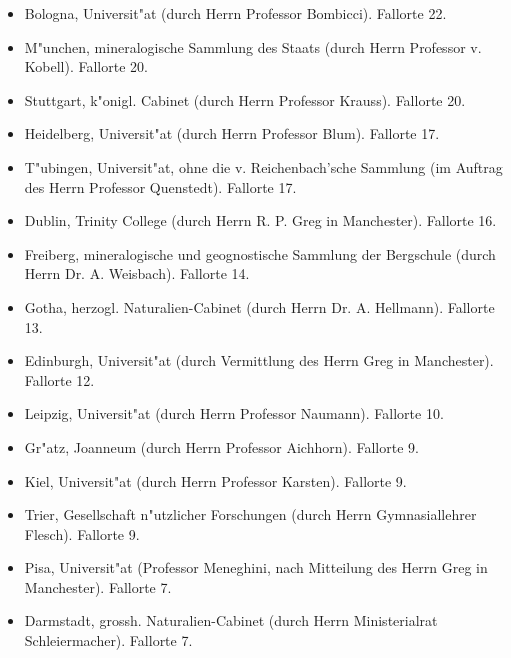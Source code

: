 \documentclass[a4paper, 11pt, oneside]{article}
\begin{document}
\begin{itemize}
    \item Bologna, Universit"at (durch Herrn Professor Bombicci). Fallorte 22.

    \item M"unchen, mineralogische Sammlung des Staats (durch Herrn Professor v. Kobell). Fallorte 20.

    \item Stuttgart, k"onigl. Cabinet (durch Herrn Professor Krauss). Fallorte 20.

    \item Heidelberg, Universit"at (durch Herrn Professor Blum). Fallorte 17.

    \item T"ubingen, Universit"at, ohne die v. Reichenbach'sche Sammlung (im Auftrag des Herrn Professor Quenstedt). Fallorte 17.

    \item Dublin, Trinity College (durch Herrn R. P. Greg in Manchester). Fallorte 16.

    \item Freiberg, mineralogische und geognostische Sammlung der Bergschule (durch Herrn Dr. A. Weisbach). Fallorte 14.

    \item Gotha, herzogl. Naturalien-Cabinet (durch Herrn Dr. A. Hellmann). Fallorte 13.

    \item Edinburgh, Universit"at (durch Vermittlung des Herrn Greg in Manchester). Fallorte 12.

    \item Leipzig, Universit"at (durch Herrn Professor Naumann). Fallorte 10.

    \item Gr"atz, Joanneum (durch Herrn Professor Aichhorn). Fallorte 9.

    \item Kiel, Universit"at (durch Herrn Professor Karsten). Fallorte 9.

    \item Trier, Gesellschaft n"utzlicher Forschungen (durch Herrn Gymnasiallehrer Flesch). Fallorte 9.

    \item Pisa, Universit"at (Professor Meneghini, nach Mitteilung des Herrn Greg in Manchester). Fallorte 7.

    \item Darmstadt, grossh. Naturalien-Cabinet (durch Herrn Ministerialrat Schleiermacher). Fallorte 7.


\end{itemize}
\end{document}
